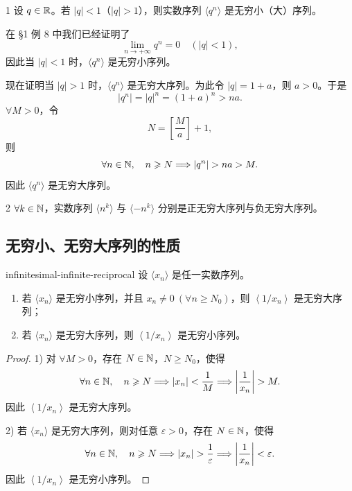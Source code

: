 \begin{sourceexample}{1}
设 \(q\in\mathbb{R}\)。若 \(|q|<1\)（\(|q|>1\)），则实数序列 \(\langle q^n\rangle\) 是无穷小（大）序列。

在 §1 例 8 中我们已经证明了
\[
\lim_{n\to+\infty}q^n=0\quad(|q|<1),
\]
因此当 \(|q|<1\) 时，\(\langle q^n\rangle\) 是无穷小序列。

现在证明当 \(|q|>1\) 时，\(\langle q^n\rangle\) 是无穷大序列。为此令 \(|q|=1+a\)，则 \(a>0\)。于是
\[
|q^n|=|q|^n=(1+a)^n>na.
\]
\(\forall M>0\)，令
\[
N=\left[\frac Ma\right]+1,
\]
则
\[
\forall n\in\N,\quad n\geqslant N\Longrightarrow |q^n|>na>M.
\]
因此 \(\langle q^n\rangle\) 是无穷大序列。
\end{sourceexample}

\begin{sourceexample}{2}
\(\forall k\in\mathbb{N}\)，实数序列 \(\langle n^k\rangle\) 与 \(\langle-n^k\rangle\) 分别是正无穷大序列与负无穷大序列。
\end{sourceexample}

\subsection{无穷小、无穷大序列的性质}

\begin{mythm}{}{infinitesimal-infinite-reciprocal}
设 \(\langle x_n\rangle\) 是任一实数序列。
\begin{enumerate}[label=\arabic*)]
  \item 若 \(\langle x_n\rangle\) 是无穷小序列，并且
  \(x_n\ne0\ (\forall n\geqslant N_0)\)，则
  \(\left\langle1/x_n\right\rangle\) 是无穷大序列；
  \item 若 \(\langle x_n\rangle\) 是无穷大序列，则
  \(\left\langle1/x_n\right\rangle\) 是无穷小序列。
\end{enumerate}
\end{mythm}

\begin{proof}
1) 对 \(\forall M>0\)，存在 \(N\in\mathbb{N}\)，\(N\geqslant N_0\)，使得
\[
\forall n\in\N,\quad n\geqslant N\Longrightarrow |x_n|<\frac1M
\Longrightarrow \left|\frac1{x_n}\right|>M.
\]
因此 \(\left\langle1/x_n\right\rangle\) 是无穷大序列。

2) 若 \(\langle x_n\rangle\) 是无穷大序列，则对任意 \(\varepsilon>0\)，存在 \(N\in\mathbb{N}\)，使得
\[
\forall n\in\N,\quad n\geqslant N\Longrightarrow |x_n|>\frac1\varepsilon
\Longrightarrow \left|\frac1{x_n}\right|<\varepsilon.
\]
因此 \(\left\langle1/x_n\right\rangle\) 是无穷小序列。
\end{proof}

